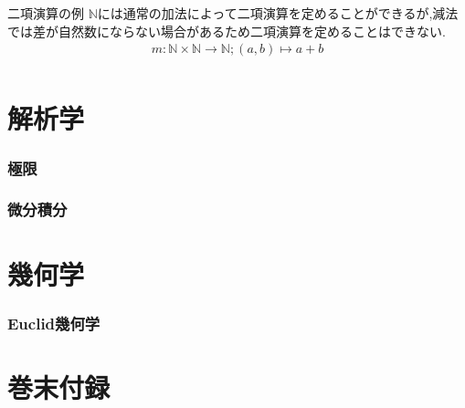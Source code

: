 \documentclass[hyperref,a4paper,12pt]{kininaruki}
\begin{document}
\begin{itembox}[l]{二項演算の例}
	$\mathbb{N}$には通常の加法によって二項演算を定めることができるが,減法では差が自然数にならない場合があるため二項演算を定めることはできない.
	\begin{align}
		m:\mathbb{N}\times{}\mathbb{N}\longrightarrow{}\mathbb{N}; (a, b)\longmapsto{}a+b\\
	\end{align}
\end{itembox}













\newpage
\part{解析学}
\section{極限}
\newpage
\section{微分積分}
\newpage
\part{幾何学}
\section{Euclid幾何学}
\part{巻末付録}
\end{document}
